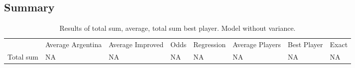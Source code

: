 \subsection{Summary}

\begin{table}[H]
\centering
\caption{Results of total sum, average, total sum best player. Model without variance.}
\begin{tabular}{llllllll}
& Average Argentina & Average Improved & Odds & Regression  & Average Players & Best Player & Exact\\
Total sum  & NA  & NA & NA & NA & NA & NA & NA \\
\end{tabular}
\end{table}


\begin{comment}
Good discussion points: 
\begin{enumerate}
    \item hvis man legger restriksjon på formasjon. Hvilke formasjon gir mest poeng?
    \item når bruker man de forskjellige chippene, og hvor effektive er de?  
\end{enumerate}
\end{comment}

